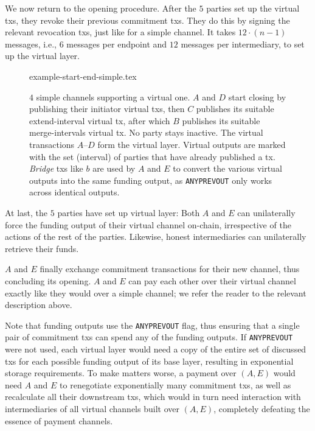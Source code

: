   We now return to the opening procedure. After the $5$ parties set up the virtual txs, they revoke their previous
  commitment
  txs. They do this by signing the relevant revocation txs, just like
  for a simple channel. It takes $12 \cdot (n-1)$ messages, i.e., $6$ messages
  per endpoint and $12$ messages per intermediary, to set up the virtual layer.

  \begin{figure*}
    \centering
    {example-start-end-simple.tex}
    \caption{$4$ simple channels supporting a virtual one. $A$ and $D$ start
    closing by publishing their initiator virtual txs, then $C$ publishes its
    suitable extend-interval virtual tx, after which $B$ publishes its suitable
    merge-intervals virtual tx. No party stays inactive. The virtual
    transactions $A$--$D$ form the virtual layer. Virtual outputs are marked
    with the set (interval) of parties that have already published a tx.
    \emph{Bridge} txs like $b$ are used by $A$ and $E$ to convert the various
    virtual outputs into the same funding output, as \texttt{ANYPREVOUT} only
    works across identical outputs.}
    \label{figure:example-start-end-simple}
  \end{figure*}

  At last, the $5$ parties have set up virtual layer: Both $A$ and $E$ can
  unilaterally
  force the funding output of their virtual channel on-chain, irrespective of
  the actions of the rest of the parties. Likewise, honest intermediaries can
  unilaterally retrieve their funds.

  $A$ and $E$ finally exchange
  commitment transactions for their new channel, thus concluding its opening.
  $A$ and $E$ can pay each other over their virtual channel exactly like
  they would over a simple channel; we refer the reader to the relevant
  description above.

  Note that funding outputs use the \texttt{ANYPREVOUT} flag, thus ensuring
  that a single pair of commitment txs can spend any of the funding outputs. If
  \texttt{ANYPREVOUT} were not used, each virtual layer would need a copy of the
  entire set of discussed txs for each possible funding output of its base
  layer, resulting in exponential storage requirements. To make matters worse,
  a payment over $(A, E)$ would need $A$ and $E$ to renegotiate exponentially
  many commitment txs, as well as recalculate all their downstream txs, which
  would in turn need interaction with intermediaries of all virtual channels
  built over $(A, E)$, completely defeating the essence of payment channels.

